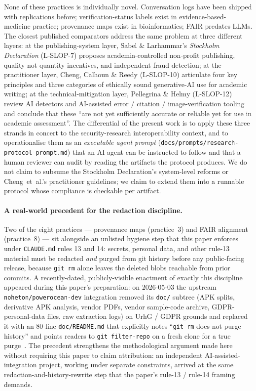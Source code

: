 \documentclass[11pt,a4paper]{article}
\begin{document}
None of these practices is individually novel. Conversation logs have
been shipped with replications before; verification-status labels
exist in evidence-based-medicine practice; provenance maps exist in
bioinformatics; FAIR predates LLMs. The closest published comparators
address the same problem at three different layers: at the
publishing-system layer, Sabel \& Larhammar's \emph{Stockholm
Declaration} (L-SLOP-7) proposes academia-controlled non-profit
publishing, quality-not-quantity incentives, and independent fraud
detection; at the practitioner layer, Cheng, Calhoun \& Reedy
(L-SLOP-10) articulate four key principles and three categories of
ethically sound generative-AI use for academic writing; at the
technical-mitigation layer, Pellegrina \& Helmy (L-SLOP-12) review
AI detectors and AI-assisted error / citation / image-verification
tooling and conclude that these ``are not yet sufficiently accurate or
reliable yet for use in academic assessment''. The differential of the
present work is to apply these three strands in concert to the
security-research interoperability context, and to operationalise them
as an \emph{executable agent prompt}
(\texttt{docs/prompts/research-protocol-prompt.md}) that an AI agent
can be instructed to follow and that a human reviewer can audit by
reading the artifacts the protocol produces. We do not claim to
subsume the Stockholm Declaration's system-level reforms or
Cheng~et~al.'s practitioner guidelines; we claim to extend them into a
runnable protocol whose compliance is checkable per artifact.

\paragraph{A real-world precedent for the redaction discipline.}
Two of the eight practices --- provenance maps (practice~3) and FAIR
alignment (practice~8) --- sit alongside an unlisted hygiene step
that this paper enforces under \texttt{CLAUDE.md} rules 13 and 14:
secrets, personal data, and other rule-13 material must be redacted
\emph{and} purged from git history before any public-facing release,
because \texttt{git rm} alone leaves the deleted blobs reachable from
prior commits. A recently-dated, publicly-visible enactment of
exactly this discipline appeared during this paper's preparation: on
2026-05-03 the upstream \texttt{noheton/powerocean-dev} integration
removed its \texttt{doc/} subtree (APK splits, derivative APK
analysis, vendor PDFs, vendor sample-code archive,
GDPR-personal-data files, raw extraction logs) on UrhG / GDPR
grounds and replaced it with an 80-line \texttt{doc/README.md} that
explicitly notes ``\texttt{git rm} does not purge history'' and
points readers to \texttt{git filter-repo} on a fresh clone for a
true
purge~\citep{noheton2026powerocean5c8b815,noheton2026powerocean_docreadme}.
The precedent strengthens the methodological argument made here
without requiring this paper to claim attribution: an independent
AI-assisted-integration project, working under separate constraints,
arrived at the same redaction-and-history-rewrite step that the
paper's rule-13 / rule-14 framing demands.
\end{document}
